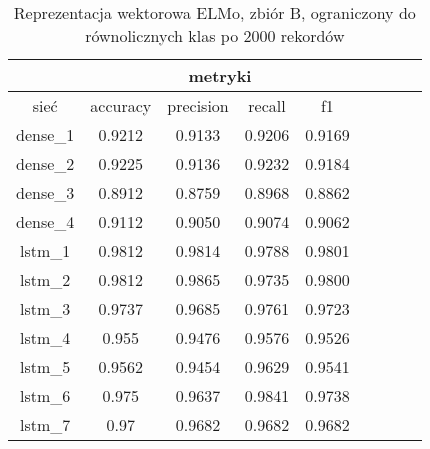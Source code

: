 \begin{table}[p] \label{tab:wyniki_elmo_B_lim} \centering
    \caption{Reprezentacja wektorowa ELMo, zbiór B, ograniczony do równolicznych klas po 2000 rekordów}
    \label{tab:wyniki_1024_eks3}
    \begin{tabular} {|c|c|c|c|c|c|c|c|c| }    \hline
                 & \multicolumn{4}{c|}{metryki}                                                                                  \\ \hline
        sieć     & accuracy                     & precision             & recall                     & f1                        \\ \hline
        dense\_1 & 0.9212                       & 0.9133                & 0.9206                     & 0.9169                    \\ \hline
        dense\_2 & 0.9225                       & 0.9136                & 0.9232                     & 0.9184                    \\ \hline
        dense\_3 & 0.8912                       & 0.8759                & 0.8968                     & 0.8862                    \\ \hline
        dense\_4 & 0.9112                       & 0.9050                & 0.9074                     & 0.9062                    \\ \hline
        lstm\_1  & 0.9812                       & 0.9814                & 0.9788                     & 0.9801                    \\ \hline
        lstm\_2  & 0.9812                       & 0.9865                & 0.9735                     & 0.9800                    \\ \hline
        lstm\_3  & 0.9737                       & 0.9685                & 0.9761                     & 0.9723                    \\ \hline
        lstm\_4  & 0.955                        & 0.9476                & 0.9576                     & 0.9526                    \\ \hline
        lstm\_5  & 0.9562                       & 0.9454                & 0.9629                     & 0.9541                    \\ \hline
        lstm\_6  & 0.975                        & 0.9637                & 0.9841                     & 0.9738                    \\ \hline
        lstm\_7  & 0.97                         & 0.9682                & 0.9682                     & 0.9682                    \\ \hline

\end{tabular}
\end{table}
